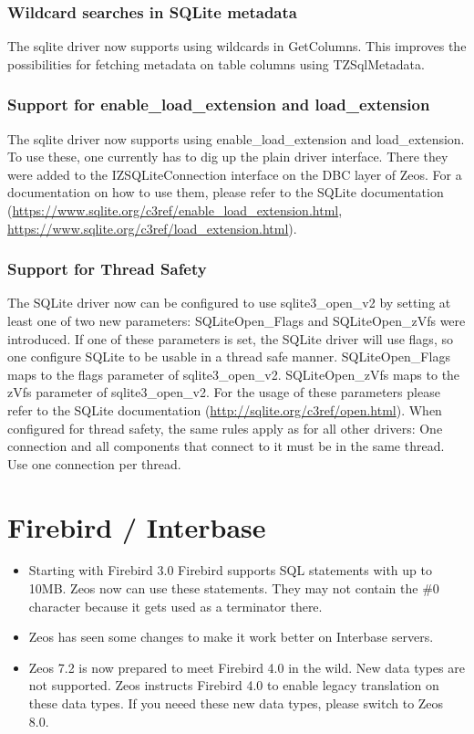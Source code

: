 \documentclass[a4paper,12pt,oneside]{book}
\begin{document}
\subsubsection{Wildcard searches in SQLite metadata}
The sqlite driver now supports using wildcards in GetColumns.
This improves the possibilities for fetching metadata on table columns using TZSqlMetadata.

\subsubsection{Support for enable\_load\_extension and load\_extension}
The sqlite driver now supports using enable\_load\_extension and load\_extension.
To use these, one currently has to dig up the plain driver interface.
There they were added to the IZSQLiteConnection interface on the DBC layer of Zeos.
For a documentation on how to use them, please refer to the SQLite documentation (\url{https://www.sqlite.org/c3ref/enable_load_extension.html}, \url{https://www.sqlite.org/c3ref/load_extension.html}).

\subsubsection{Support for Thread Safety}
The SQLite driver now can be configured to use sqlite3\_open\_v2 by setting at least one of two new parameters:
SQLiteOpen\_Flags and SQLiteOpen\_zVfs were introduced.
If one of these parameters is set, the SQLite driver will use flags, so one configure SQLite to be usable in a thread safe manner.
SQLiteOpen\_Flags maps to the flags parameter of sqlite3\_open\_v2.
SQLiteOpen\_zVfs maps to the zVfs parameter of sqlite3\_open\_v2.
For the usage of these parameters please refer to the SQLite documentation (\url{http://sqlite.org/c3ref/open.html}).
When configured for thread safety, the same rules apply as for all other drivers:
One connection and all components that connect to it must be in the same thread.
Use one connection per thread.

\section{Firebird / Interbase}
\begin{itemize}
\item Starting with Firebird 3.0 Firebird supports SQL statements with up to 10MB. Zeos now can use these statements. They may not contain the \#0 character because it gets used as a terminator there.
\item Zeos has seen some changes to make it work better on Interbase servers.
\item Zeos 7.2 is now prepared to meet Firebird 4.0 in the wild. New data types are not supported. Zeos instructs Firebird 4.0 to enable legacy translation on these data types. If you neeed these new data types, please switch to Zeos 8.0.
\end{itemize}
\end{document}
